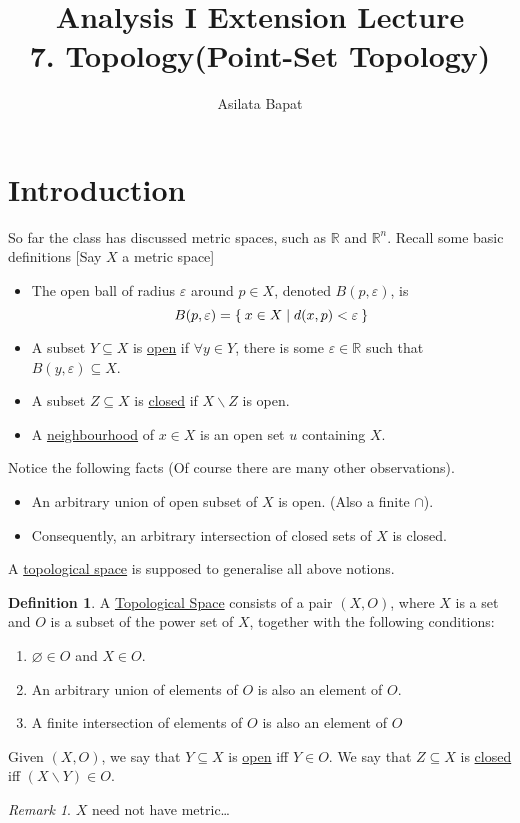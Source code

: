 \documentclass[12pt]{amsart}
\title[Point-Set Topology]
{Analysis I Extension Lecture\\7. Topology(Point-Set Topology)}
\author{Asilata Bapat}
\newcommand{\bbR}{\mathbb{R}}
\theoremstyle{plain}
\theoremstyle{remark}
\newtheorem*{rmk}{Remark}
\theoremstyle{definition}
\newtheorem*{define}{Definition}
\begin{document}
\maketitle
{}

\section*{Introduction}
So far the class has discussed metric spaces, such as $\bbR$ and $\bbR^n$. Recall some basic definitions [Say $X$ a metric space]
\begin{itemize}
	\item 
		The open ball of radius $\varepsilon$ around $p\in X$, denoted $B(p,\varepsilon)$, is 
		\begin{equation*}
			B(p, \varepsilon) = \Set{x \in X | d(x,p) < \varepsilon}
		\end{equation*}
	\item
		A subset $Y \subseteq X$ is \ul{open} if $\forall y \in Y$, there is some $\varepsilon \in \bbR$ such that $B(y,\varepsilon) \subseteq X$.
	\item
		A subset $Z \subseteq X$ is \ul{closed} if $X\backslash Z$ is open.
	\item A \ul{neighbourhood} of $x \in X$ is an open set $u$ containing $X$.
\end{itemize}

Notice the following facts (Of course there are many other observations).
\begin{itemize}
	\item 
		An arbitrary union of open subset of $X$ is open. (Also a finite $\cap$).
	\item
		Consequently, an arbitrary intersection of closed sets of $X$ is closed.
\end{itemize}

A \ul{topological space} is supposed to generalise all above notions.

\begin{define}
	A \ul{Topological Space} consists of a pair $(X, O)$, where $X$ is a set and $O$ is a subset of the power set of $X$, together with the following conditions:
	\begin{enumerate}[$(1)$]
		\item
			$\varnothing \in O$ and $X \in O$.
		\item
			An arbitrary union of elements of $O$ is also an element of $O$.
		\item
			A finite intersection of elements of $O$ is also an element of $O$
	\end{enumerate}

	Given $(X,O)$, we say that $Y \subseteq X$ is \ul{open} iff $Y \in O$. We say that $Z\subseteq X$ is \ul{closed} iff $(X\backslash Y) \in O$.
\end{define}
\begin{rmk}
	$X$ need not have metric\ldots 
\end{rmk}
\end{document}
